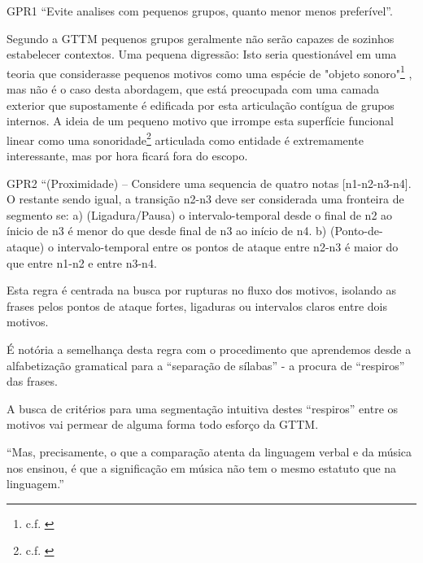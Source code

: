 \documentclass[
	12pt,				%
	openright,			%
	twoside,			%
	a4paper,			%
	english,			%
	french,				%
	spanish,			%
	brazil				%
	]{abntex2}
\begin{document}
\begin{citacao}
GPR1 “Evite analises com pequenos grupos, quanto menor menos preferível”.
\cite[ p.43]{lerdahl1983generative}
\end{citacao}


Segundo a GTTM pequenos grupos geralmente não serão capazes de sozinhos estabelecer contextos. Uma pequena digressão: Isto seria questionável em uma teoria que considerasse pequenos motivos como uma espécie de "objeto sonoro"\footnote{c.f. \cite{guigue1995analise}} , mas não é o caso desta abordagem, que está preocupada com uma camada exterior que supostamente é edificada por esta articulação contígua de grupos internos. A ideia de um pequeno motivo que irrompe esta superfície funcional linear como uma sonoridade\footnote{c.f. \cite{guigue2012}} articulada como entidade é extremamente interessante, mas por hora ficará fora do escopo.

\begin{citacao}
GPR2 “(Proximidade) – Considere uma sequencia de quatro notas [n1-n2-n3-n4].\linebreak
O restante sendo igual, a transição n2-n3 deve ser considerada uma fronteira de segmento se:\linebreak
a) (Ligadura/Pausa) o intervalo-temporal desde o final de n2 ao ínicio de n3 é menor do que desde final de n3 ao início de n4.\linebreak
b) (Ponto-de-ataque) o intervalo-temporal entre os pontos de ataque entre n2-n3 é maior do que entre n1-n2  e entre n3-n4.
\cite[ p.45]{lerdahl1983generative}
\end{citacao}

Esta regra é centrada na busca por rupturas no fluxo dos motivos, isolando as frases pelos pontos de ataque fortes, ligaduras ou intervalos claros entre dois motivos.  


É notória a semelhança desta regra com o procedimento que aprendemos desde a alfabetização gramatical para a “separação de sílabas” - a procura de “respiros” das frases. 


A busca de critérios para uma segmentação intuitiva destes “respiros” entre os motivos vai permear de alguma forma todo esforço da GTTM. 

\begin{citacao}
“Mas, precisamente, o que a comparação atenta da linguagem verbal e da música nos ensinou, é que a significação em música não tem o mesmo estatuto que na linguagem.”\cite[ p.9]{nattiez2004modelos}
\end{citacao}
\end{document}
